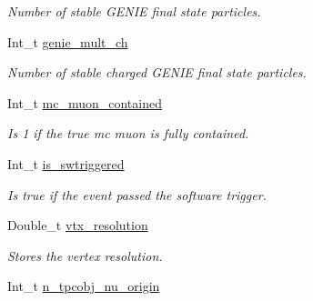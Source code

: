 \begin{DoxyCompactItemize}
\begin{DoxyCompactList}\small\item\em Number of stable G\-E\-N\-I\-E final state particles. \end{DoxyCompactList}\item 
\hypertarget{classUBXSecEvent_a6a73137488dc2af0dc6abd5868fbbe4d}{Int\-\_\-t \hyperlink{classUBXSecEvent_a6a73137488dc2af0dc6abd5868fbbe4d}{genie\-\_\-mult\-\_\-ch}}\label{classUBXSecEvent_a6a73137488dc2af0dc6abd5868fbbe4d}

\begin{DoxyCompactList}\small\item\em Number of stable charged G\-E\-N\-I\-E final state particles. \end{DoxyCompactList}\item 
\hypertarget{classUBXSecEvent_a350303f94db8bcfdbc2e517713d7ebf9}{Int\-\_\-t \hyperlink{classUBXSecEvent_a350303f94db8bcfdbc2e517713d7ebf9}{mc\-\_\-muon\-\_\-contained}}\label{classUBXSecEvent_a350303f94db8bcfdbc2e517713d7ebf9}

\begin{DoxyCompactList}\small\item\em Is 1 if the true mc muon is fully contained. \end{DoxyCompactList}\item 
\hypertarget{classUBXSecEvent_aedee1ade9f68dfb32fba0b943125f52d}{Int\-\_\-t \hyperlink{classUBXSecEvent_aedee1ade9f68dfb32fba0b943125f52d}{is\-\_\-swtriggered}}\label{classUBXSecEvent_aedee1ade9f68dfb32fba0b943125f52d}

\begin{DoxyCompactList}\small\item\em Is true if the event passed the software trigger. \end{DoxyCompactList}\item 
\hypertarget{classUBXSecEvent_aa6c3a4dd22dfd2d39be8fa74b3703230}{Double\-\_\-t \hyperlink{classUBXSecEvent_aa6c3a4dd22dfd2d39be8fa74b3703230}{vtx\-\_\-resolution}}\label{classUBXSecEvent_aa6c3a4dd22dfd2d39be8fa74b3703230}

\begin{DoxyCompactList}\small\item\em Stores the vertex resolution. \end{DoxyCompactList}\item 
\hypertarget{classUBXSecEvent_a0ae9b16a767089e072f0b82da7e071d4}{Int\-\_\-t \hyperlink{classUBXSecEvent_a0ae9b16a767089e072f0b82da7e071d4}{n\-\_\-tpcobj\-\_\-nu\-\_\-origin}}\label{classUBXSecEvent_a0ae9b16a767089e072f0b82da7e071d4}


\end{DoxyCompactItemize}
